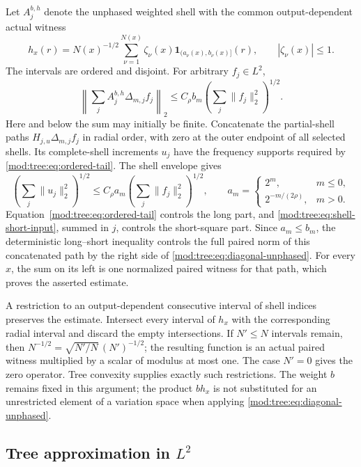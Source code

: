 \documentclass[11pt]{article}
\numberwithin{equation}{section}
\theoremstyle{remark}
\theoremstyle{definition}
\begin{document}
Let $A_j^{b,h}$ denote the unphased weighted shell with the common
output-dependent actual witness
\[
 h_x(r)=N(x)^{-1/2}\sum_{\nu=1}^{N(x)}\zeta_\nu(x)
          \mathbf1_{(a_\nu(x),b_\nu(x)]}(r),
 \qquad |\zeta_\nu(x)|\le1.
\]
The intervals are ordered and disjoint. For arbitrary $f_j\in L^2$,
\begin{equation}\label{mod:tree:eq:diagonal-unphased}
 \left\|\sum_jA_j^{b,h}\Delta_{m,j}f_j\right\|_2
 \le C_\rho b_m\left(\sum_j\|f_j\|_2^2\right)^{1/2}.
\end{equation}
Here and below the sum may initially be finite. Concatenate the
partial-shell paths $H_{j,u}\Delta_{m,j}f_j$ in radial order, with
zero at the outer endpoint of all selected shells. Its complete-shell
increments $u_j$ have the frequency supports required by
\eqref{mod:tree:eq:ordered-tail}. The shell envelope gives
\[
 \left(\sum_j\|u_j\|_2^2\right)^{1/2}
 \le C_\rho a_m\left(\sum_j\|f_j\|_2^2\right)^{1/2},
 \qquad
 a_m=\begin{cases}2^m,&m\le0,\\2^{-m/(2\rho)},&m>0.\end{cases}
\]
Equation~\eqref{mod:tree:eq:ordered-tail} controls the long part, and
\eqref{mod:tree:eq:shell-short-input}, summed in $j$, controls the
short-square part. Since $a_m\le b_m$, the deterministic long--short
inequality controls the full paired norm of this concatenated path by
the right side of \eqref{mod:tree:eq:diagonal-unphased}. For every
$x$, the sum on its left is one normalized paired witness for that
path, which proves the asserted estimate.

A restriction to an output-dependent consecutive interval of shell
indices preserves the estimate. Intersect every interval of $h_x$ with
the corresponding radial interval and discard the empty intersections.
If $N'\le N$ intervals remain, then
$N^{-1/2}=\sqrt{N'/N}\,(N')^{-1/2}$; the resulting function is an
actual paired witness multiplied by a scalar of modulus at most one.
The case $N'=0$ gives the zero operator. Tree convexity supplies exactly
such restrictions. The weight $b$ remains fixed in this argument;
the product $bh_x$ is not substituted for an unrestricted element of
a variation space when applying
\eqref{mod:tree:eq:diagonal-unphased}.

\subsection{Tree approximation in \texorpdfstring{$L^2$}{L2}}
\end{document}

